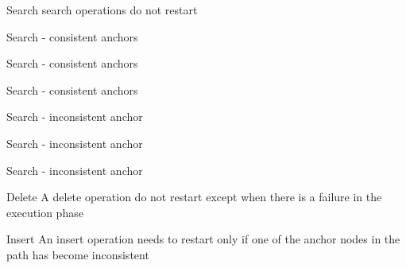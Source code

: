 \begin{frame}[c]{Search}
search operations do not restart

\end{frame}

\begin{frame}[c]{Search - consistent anchors}

\end{frame}
\begin{frame}[c]{Search - consistent anchors}

\end{frame}
\begin{frame}[c]{Search - consistent anchors}

\end{frame}

\begin{frame}[c]{Search - inconsistent anchor}

\end{frame}
\begin{frame}[c]{Search - inconsistent anchor}

\end{frame}
\begin{frame}[c]{Search - inconsistent anchor}

\end{frame}

\begin{frame}[c]{Delete}
A delete operation do not restart except when there is a failure in the execution phase

\end{frame}

\begin{frame}[c]{Insert}
An insert operation needs to restart only if one of the anchor nodes in the path has become inconsistent

\end{frame}